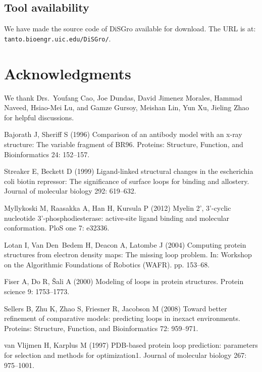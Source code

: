 \subsection*{Tool availability}
We have made the source code of {\sc DiSGro} available for download.
The URL is at: {\tt tanto.bioengr.uic.edu/DiSGro/}.

\section*{Acknowledgments}
We thank Drs.\ Youfang Cao, Joe Dundas, David Jimenez Morales,
Hammad Naveed, Hsiao-Mei Lu, and Gamze Gursoy, Meishan Lin, Yun Xu,
Jieling Zhao for helpful discussions.



\begin{thebibliography}{10}
Bajorath J, Sheriff S (1996) Comparison of an antibody model with an
x-ray
  structure: The variable fragment of {BR}96.
\newblock Proteins: Structure, Function, and Bioinformatics 24: 152--157.

Streaker E, Beckett D (1999) Ligand-linked structural changes in the
  escherichia coli biotin repressor: The significance of surface loops for
  binding and allostery.
\newblock Journal of molecular biology 292: 619--632.

Myllykoski M, Raasakka A, Han H, Kursula P (2012) Myelin 2',
3'-cyclic
  nucleotide 3'-phosphodiesterase: active-site ligand binding and molecular
  conformation.
\newblock PloS one 7: e32336.

Lotan I, Van Den~Bedem H, Deacon A, Latombe J (2004) Computing
protein
  structures from electron density maps: The missing loop problem.
\newblock In: Workshop on the Algorithmic Foundations of Robotics (WAFR). pp.
  153--68.

Fiser A, Do R, {\v{S}}ali A (2000) Modeling of loops in protein
structures.
\newblock Protein science 9: 1753--1773.

Sellers B, Zhu K, Zhao S, Friesner R, Jacobson M (2008) Toward
better
  refinement of comparative models: predicting loops in inexact environments.
\newblock Proteins: Structure, Function, and Bioinformatics 72: 959--971.

van Vlijmen H, Karplus M (1997) {PDB}-based protein loop prediction:
parameters
  for selection and methods for optimization1.
\newblock Journal of molecular biology 267: 975--1001.


\end{thebibliography}
